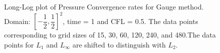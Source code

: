 \begin{figure}[H]
	\centering
	\caption{Long-Log plot of Pressure Convergence rates for Gauge method. Domain: $[-\dfrac{1}{2},\dfrac{1}{2}]^2$, time = 1 and CFL = 0.5. The data points corresponding to grid sizes of 15, 30, 60, 120, 240, and 480.The data points for $L_1$ and $L_\infty$ are shifted to distinguish with $L_2$.}\label{fig:6.10}
\end{figure}

